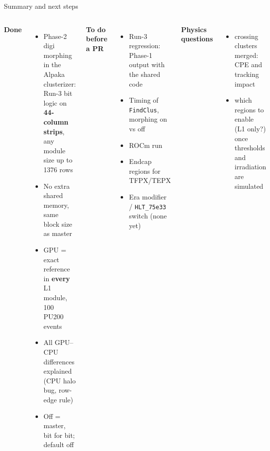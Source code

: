 \documentclass[aspectratio=169,10pt,xcolor=table]{beamer}
\newcommand{\code}[1]{\texttt{\small #1}}
\begin{document}
\begin{frame}{Summary and next steps}
  \begin{columns}[T]
    \textbf{Done}
    \begin{itemize}\small
      \item Phase-2 digi morphing in the Alpaka clusterizer: Run-3 bit logic on \textbf{44-column strips}, any module size up to 1376 rows
      \item No extra shared memory, same block size as master
      \item GPU = exact reference in \textbf{every} L1 module, 100 PU200 events
      \item All GPU--CPU differences explained (CPU halo bug, row-edge rule)
      \item Off = master, bit for bit; default off
    \end{itemize}
    \textbf{To do before a PR}
    \begin{itemize}\small
      \item Run-3 regression: Phase-1 output with the shared code
      \item Timing of \code{FindClus}, morphing on vs off
      \item ROCm run
      \item Endcap regions for TFPX/TEPX
      \item Era modifier / \code{HLT\_75e33} switch (none yet)
    \end{itemize}
    \textbf{Physics questions}
    \begin{itemize}\small
      \item crossing clusters merged: CPE and tracking impact
      \item which regions to enable (L1 only?) once thresholds and irradiation are simulated
    \end{itemize}
  \end{columns}
\end{frame}
\end{document}
